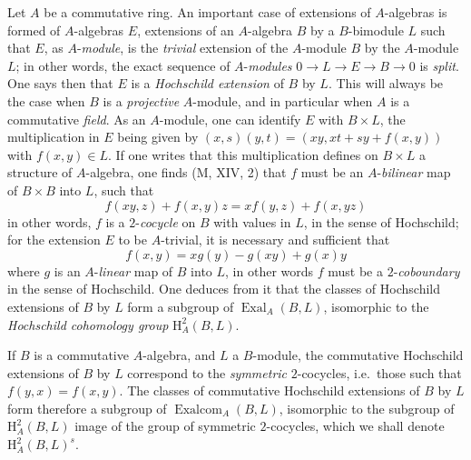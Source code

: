 \begin{env}[18.4.3]
\label{0.18.4.3}
Let $A$ be a commutative ring.
An important case of extensions of $A$-algebras is formed of $A$-algebras $E$, extensions of an $A$-algebra $B$ by a $B$-bimodule $L$ such that $E$, as $A$-\emph{module}, is the \emph{trivial} extension of the $A$-module $B$ by the $A$-module $L$; in other words, the exact sequence of $A$-\emph{modules} $0\to L\to E\to B\to 0$ is \emph{split}.
One says then that $E$ is a \emph{Hochschild extension} of $B$ by $L$.
This will always be the case when $B$ is a \emph{projective} $A$-module, and in particular when $A$ is a commutative \emph{field}.
As an $A$-module, one can identify $E$ with $B\times L$, the multiplication in $E$ being given by $(x,s)(y,t)=(xy,xt+sy+f(x,y))$ with $f(x,y)\in L$.
If one writes that this multiplication defines on $B\times L$ a structure of $A$-algebra, one finds (M, XIV, 2) that $f$ must be an $A$-\emph{bilinear} map of $B\times B$ into $L$, such that
\begin{equation}
\tag{18.4.3.1}
  \label{0.18.4.3.1}
  f(xy,z)+f(x,y)z=xf(y,z)+f(x,yz)
\end{equation}
in other words, $f$ is a $2$-\emph{cocycle} on $B$ with values in $L$, in the sense of Hochschild; for the extension $E$ to be $A$-trivial, it is necessary and sufficient that
\begin{equation}
\tag{18.4.3.2}
  \label{0.18.4.3.2}
  f(x,y)=xg(y)-g(xy)+g(x)y
\end{equation}
where $g$ is an $A$-\emph{linear} map of $B$ into $L$, in other words $f$ must be a $2$-\emph{coboundary} in the sense of Hochschild.
One deduces from it that the classes of Hochschild extensions of $B$ by $L$ form a subgroup of $\operatorname{Exal}_A(B,L)$, isomorphic to the \emph{Hochschild cohomology group} $\mathrm{H}^2_A(B,L)$.

If $B$ is a commutative $A$-algebra, and $L$ a $B$-module, the commutative Hochschild extensions of $B$ by $L$ correspond to the \emph{symmetric} $2$-cocycles, i.e.\ those such that $f(y,x)=f(x,y)$.
The classes of commutative Hochschild extensions of $B$ by $L$ form therefore a subgroup of $\operatorname{Exalcom}_A(B,L)$, isomorphic to the subgroup of $\mathrm{H}^2_A(B,L)$ image of the group of symmetric $2$-cocycles, which we shall denote $\mathrm{H}^2_A(B,L)^s$.
\end{env}


